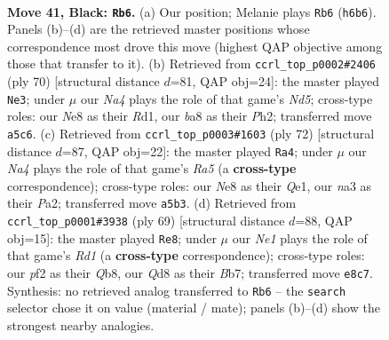 \documentclass[11pt]{article}
\begin{document}
\clearpage

\begin{figure}[p]\centering
\begin{subfigure}{0.46\textwidth}\centering
\resizebox{\linewidth}{!}{%
\newchessgame
\chessboard[
  setfen={B2qn3/3b2k1/p6r/n3Pp1p/PQ1P2p1/N7/5PPP/R3K1N1 b - - 5 41},
  showmover=false,
  pgfstyle=straightmove, color=movearrow, markmove={h6-b6}
]}
\caption{}
\end{subfigure}\hfill
\begin{subfigure}{0.46\textwidth}\centering
\resizebox{\linewidth}{!}{%
\newchessgame
\chessboard[
  setfen={1r1q2k1/5pp1/p2pb1np/1p1N4/1P6/P5P1/3Q1PBP/3R2K1 w - - 10 36},
  showmover=false,
  pgfstyle=straightmove, color=movearrow, markmove={d5-e3}
]}
\caption{}
\end{subfigure}
\\[4pt]
\begin{subfigure}{0.46\textwidth}\centering
\resizebox{\linewidth}{!}{%
\newchessgame
\chessboard[
  setfen={3r2k1/2q2p2/4p1p1/RBpn3p/8/1P1N1bP1/P1P4P/2K1Q3 w - - 2 37},
  showmover=false,
  pgfstyle=straightmove, color=movearrow, markmove={a5-a4}
]}
\caption{}
\end{subfigure}\hfill
\begin{subfigure}{0.46\textwidth}\centering
\resizebox{\linewidth}{!}{%
\newchessgame
\chessboard[
  setfen={1q1r2k1/1b3pp1/1p2pnnp/8/1PP5/2Q2NPP/1B3PB1/R5K1 b - - 8 35},
  showmover=false,
  pgfstyle=straightmove, color=movearrow, markmove={d8-e8}
]}
\caption{}
\end{subfigure}
\caption{\textbf{Move 41, Black: \texttt{Rb6}.} (a) Our position; Melanie plays \texttt{Rb6} (\texttt{h6b6}). Panels (b)--(d) are the retrieved master positions whose correspondence most drove this move (highest QAP objective among those that transfer to it). (b) Retrieved from \texttt{ccrl\_top\_p0002\#2406} (ply 70) [structural distance $d$=81, QAP obj=24]: the master played \texttt{Ne3}; under $\mu$ our \emph{Na4} plays the role of that game's \emph{Nd5}; cross-type roles: our \emph{N}e8 as their \emph{R}d1, our \emph{b}a8 as their \emph{P}h2; transferred move \texttt{a5c6}. (c) Retrieved from \texttt{ccrl\_top\_p0003\#1603} (ply 72) [structural distance $d$=87, QAP obj=22]: the master played \texttt{Ra4}; under $\mu$ our \emph{Na4} plays the role of that game's \emph{Ra5} (a \textbf{cross-type} correspondence); cross-type roles: our \emph{N}e8 as their \emph{Q}e1, our \emph{n}a3 as their \emph{P}a2; transferred move \texttt{a5b3}. (d) Retrieved from \texttt{ccrl\_top\_p0001\#3938} (ply 69) [structural distance $d$=88, QAP obj=15]: the master played \texttt{Re8}; under $\mu$ our \emph{Ne1} plays the role of that game's \emph{Rd1} (a \textbf{cross-type} correspondence); cross-type roles: our \emph{p}f2 as their \emph{Q}b8, our \emph{Q}d8 as their \emph{B}b7; transferred move \texttt{e8c7}. Synthesis: no retrieved analog transferred to \texttt{Rb6} -- the \texttt{search} selector chose it on value (material / mate); panels (b)--(d) show the strongest nearby analogies.}
\label{fig:thought-m81}
\end{figure}
\end{document}
